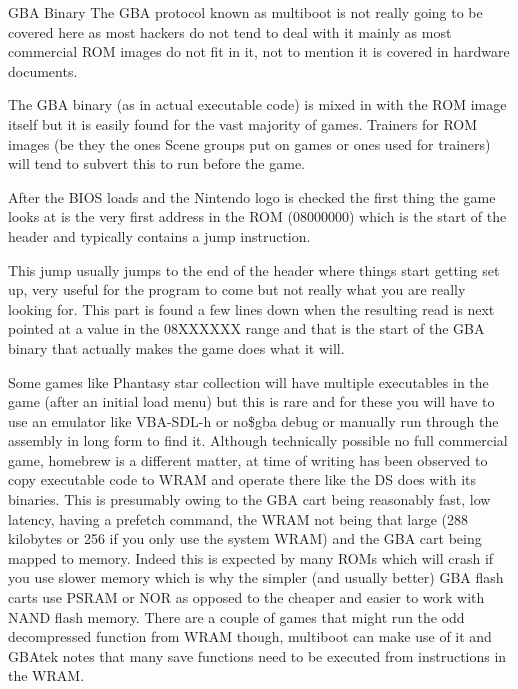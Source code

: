 \documentclass[
]{book}
\begin{document}
GBA Binary The GBA protocol known as multiboot is not really going to be covered here as most hackers do not tend to deal with it mainly as most commercial ROM images do not fit in it, not to mention it is covered in hardware documents.

The GBA binary (as in actual executable code) is mixed in with the ROM image itself but it is easily found for the vast majority of games. Trainers for ROM images (be they the ones Scene groups put on games or ones used for trainers) will tend to subvert this to run before the game.

After the BIOS loads and the Nintendo logo is checked the first thing the game looks at is the very first address in the ROM (08000000) which is the start of the header and typically contains a jump instruction.

This jump usually jumps to the end of the header where things start getting set up, very useful for the program to come but not really what you are really looking for. This part is found a few lines down when the resulting read is next pointed at a value in the 08XXXXXX range and that is the start of the GBA binary that actually makes the game does what it will.

Some games like Phantasy star collection will have multiple executables in the game (after an initial load menu) but this is rare and for these you will have to use an emulator like VBA-SDL-h or no\$gba debug or manually run through the assembly in long form to find it. Although technically possible no full commercial game, homebrew is a different matter, at time of writing has been observed to copy executable code to WRAM and operate there like the DS does with its binaries. This is presumably owing to the GBA cart being reasonably fast, low latency, having a prefetch command, the WRAM not being that large (288 kilobytes or 256 if you only use the system WRAM) and the GBA cart being mapped to memory. Indeed this is expected by many ROMs which will crash if you use slower memory which is why the simpler (and usually better) GBA flash carts use PSRAM or NOR as opposed to the cheaper and easier to work with NAND flash memory. There are a couple of games that might run the odd decompressed function from WRAM though, multiboot can make use of it and GBAtek notes that many save functions need to be executed from instructions in the WRAM.
\end{document}
